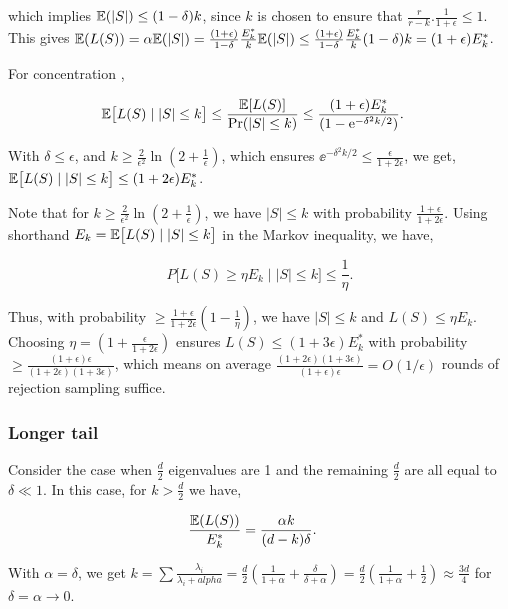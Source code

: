 \documentclass[12pt]{sty/colt2019/colt2018-arxiv}
\begin{document}
which implies $\mathbb E(|S|) \leq (1-\delta)k$, since $k$ is chosen to ensure that $\frac{r}{r-k}.\frac{1}{1+\epsilon} \leq 1$. This gives $\mathbb E(L(S)) = \alpha \mathbb E(|S|) = \frac{(1+\epsilon)}{1-\delta} \frac{E^*_k}{k} \mathbb E(|S|) \leq \frac{(1+\epsilon)}{1-\delta} \frac{E^*_k}{k} (1-\delta) k = (1+\epsilon) E^*_k$.

 For concentration , 

\begin{align*}
	& \mathbb E\big[L(S)\mid |S|\leq k\big] \leq \frac{\mathbb E[L(S)]}{\mathrm{Pr}(|S|\leq k)} \leq \frac {(1+\epsilon)E^*_k}{(1-\mathrm{e}^{-\delta^2k/2}) }.  
\end{align*}

With $\delta \leq \epsilon$, and $k \geq \frac{2}{\epsilon^2} \ln \left(2 + \frac1{\epsilon} \right)$, which ensures $\ee^{-\delta^2 k/2} \leq \frac{\epsilon}{1+2\epsilon}$, we get, $\mathbb E\big[L(S)\mid |S|\leq k\big] \leq (1+2\epsilon) E^*_k$.

Note that for $k \geq \frac{2}{\epsilon^2} \ln \left(2 + \frac1{\epsilon} \right)$, we have $|S| \leq k$ with probability $\frac{1+\epsilon}{1+2\epsilon}$. Using shorthand $E_k=\mathbb E\big[L(S)\mid |S|\leq k\big]$ in the Markov inequality, we have,

\[ P\big[L(S) \geq \eta E_k \mid |S| \leq k \big] \leq \frac{1}{\eta}. \]

Thus, with probability $\geq  \frac{1+\epsilon}{1+2\epsilon} (1 - \frac1{\eta})$, we have $|S| \leq k$ and  $L(S) \leq \eta E_k$. Choosing $\eta = (1+\frac \epsilon {1+2\epsilon})$ ensures $L(S) \leq (1+3\epsilon)E^*_k$ with probability $\geq  \frac{(1+\epsilon)\epsilon}{(1+2\epsilon)(1+3\epsilon)}$, which means on average $\frac{(1+2\epsilon)(1+3\epsilon)}{(1+\epsilon)\epsilon} = O(1/\epsilon)$ rounds of rejection sampling suffice.



\subsubsection{Longer tail}
Consider the case when $\frac{d}{2}$ eigenvalues are 1 and the remaining $\frac{d}{2}$ are all equal to $\delta \ll 1$. In this case, for $k>\frac{d}{2}$ we have, 

\begin{align*}
\frac{\mathbb E(L(S)) } {E^*_k} &= \frac{\alpha k}{(d-k)\delta}.
\end{align*}   


With $\alpha = \delta$, we get $k = \sum \frac{\lambda_i}{\lambda_i + alpha}= \frac{d}{2}(\frac{1}{1+\alpha} + \frac{\delta}{\delta + \alpha}) = \frac{d}{2} (\frac{1}{1+\alpha} + \frac{1}{2}) \approx \frac{3d}{4}$ for $\delta = \alpha \rightarrow 0$.
\end{document}

